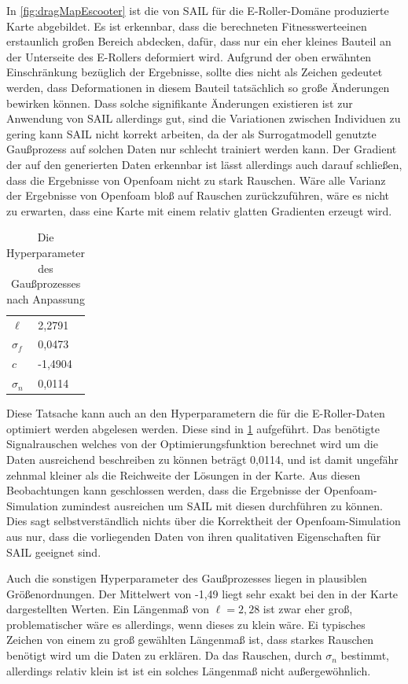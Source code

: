 In \cref{fig:dragMapEscooter} ist die von SAIL für die E-Roller-Domäne produzierte Karte abgebildet.
Es ist erkennbar, dass die berechneten Fitnesswerteeinen erstaunlich großen Bereich abdecken, dafür, dass nur ein eher kleines Bauteil an der Unterseite des E-Rollers deformiert wird.
Aufgrund der oben erwähnten Einschränkung bezüglich der Ergebnisse, sollte dies nicht als Zeichen gedeutet werden, dass Deformationen in diesem Bauteil tatsächlich so große Änderungen bewirken können.
Dass solche signifikante Änderungen existieren ist zur Anwendung von SAIL allerdings gut, sind die Variationen zwischen Individuen zu gering kann SAIL nicht korrekt arbeiten, da der als Surrogatmodell genutzte Gaußprozess auf solchen Daten nur schlecht trainiert werden kann.
Der Gradient der auf den generierten Daten erkennbar ist lässt allerdings auch darauf schließen, dass die Ergebnisse von Openfoam nicht zu stark Rauschen.
Wäre alle Varianz der Ergebnisse von Openfoam bloß auf Rauschen zurückzuführen, wäre es nicht zu erwarten, dass eine Karte mit einem relativ glatten Gradienten erzeugt wird.
\begin{table}[h]
	\begin{tabularx}{.5\textwidth}{ll}\hline
		$\ell$ & 2,2791 \\
		$\sigma_f$ & 0,0473 \\
		$c$ & -1,4904 \\
		$\sigma_n$ & 0,0114 \\
	\end{tabularx}
	\label{tab:hyperparamsEscooter}
	\caption{Die Hyperparameter des Gaußprozesses nach Anpassung}
\end{table}
Diese Tatsache kann auch an den Hyperparametern die für die E-Roller-Daten optimiert werden abgelesen werden.
Diese sind in \cref{tab:hyperparamsEscooter} aufgeführt.
Das benötigte Signalrauschen welches von der Optimierungsfunktion berechnet wird um die Daten ausreichend beschreiben zu können beträgt 0,0114, und ist damit ungefähr zehnmal kleiner als die Reichweite der Lösungen in der Karte.
Aus diesen Beobachtungen kann geschlossen werden, dass die Ergebnisse der Openfoam-Simulation zumindest ausreichen um SAIL mit diesen durchführen zu können.
Dies sagt selbstverständlich nichts über die Korrektheit der Openfoam-Simulation aus nur, dass die vorliegenden Daten von ihren qualitativen Eigenschaften für SAIL geeignet sind.

Auch die sonstigen Hyperparameter des Gaußprozesses liegen in plausiblen Größenordnungen.
Der Mittelwert von -1,49 liegt sehr exakt bei den in der Karte dargestellten Werten.
Ein Längenmaß von $\ell=2,28$ ist zwar eher groß, problematischer wäre es allerdings, wenn dieses zu klein wäre.
Ei typisches Zeichen von einem zu groß gewählten Längenmaß ist, dass starkes Rauschen benötigt wird um die Daten zu erklären.
Da das Rauschen, durch $\sigma_n$ bestimmt, allerdings relativ klein ist ist ein solches Längenmaß nicht außergewöhnlich.

